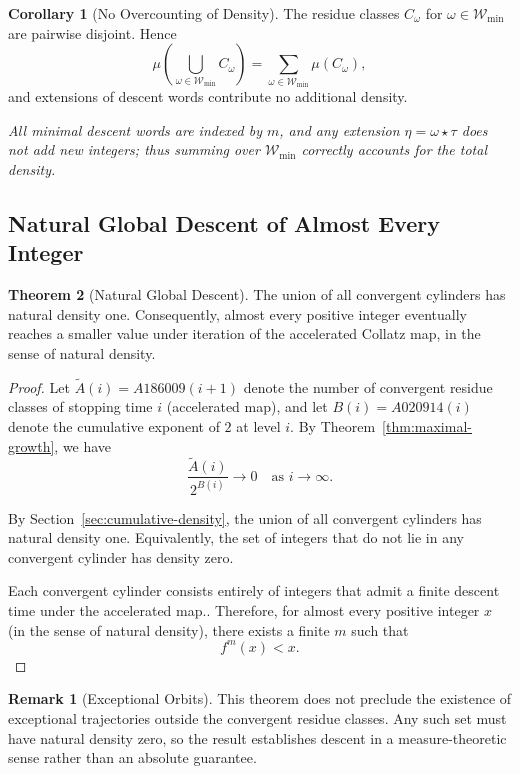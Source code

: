 \documentclass[12pt, oneside]{article}   	%
\numberwithin{equation}{section}          %
\theoremstyle{definition}
\newtheorem{theorem}{Theorem}
\newtheorem{corollary}[theorem]{Corollary}
\newtheorem*{remark}{Remark}
\begin{document}
\begin{corollary}[No Overcounting of Density]
\label{cor:no-overcount}
The residue classes $C_\omega$ for $\omega \in \mathcal{W}_{\min}$ are pairwise
disjoint. Hence
\[
\mu\!\left(\bigcup_{\omega\in\mathcal{W}_{\min}} C_\omega\right)
= \sum_{\omega\in\mathcal{W}_{\min}} \mu(C_\omega),
\]
and extensions of descent words contribute no additional density.

\emph{All minimal descent words are indexed by $m$, and any extension
$\eta = \omega \star \tau$ does not add new integers; thus summing over
$\mathcal{W}_{\min}$ correctly accounts for the total density.}
\end{corollary}


\subsection{Natural Global Descent of Almost Every Integer}

\begin{theorem}[Natural Global Descent]
\label{thm:natural-descent}
The union of all convergent cylinders has natural density one. Consequently,
almost every positive integer eventually reaches a smaller value under iteration
of the accelerated Collatz map, in the sense of natural density.
\end{theorem}

\begin{proof}
Let $\widetilde A(i) = A186009(i+1)$ denote the number of convergent residue classes
of stopping time $i$ (accelerated map), and let $B(i) = A020914(i)$ denote the cumulative exponent
of $2$ at level $i$. By Theorem~\ref{thm:maximal-growth}, we have
\[
\frac{\widetilde A(i)}{2^{B(i)}} \longrightarrow 0 \quad \text{as } i \to \infty.
\]

By Section~\ref{sec:cumulative-density}, the union of all convergent
cylinders has natural density one. Equivalently, the set of integers
that do not lie in any convergent cylinder has density zero.

Each convergent cylinder consists entirely of integers that admit a finite
descent time under the accelerated map.. Therefore, for almost every
positive integer $x$ (in the sense of natural density), there exists a
finite $m$ such that
\[
f^m(x) < x.
\]
\end{proof}

\begin{remark}[Exceptional Orbits]
This theorem does not preclude the existence of exceptional trajectories outside
the convergent residue classes. Any such set must have natural density zero, 
so the result establishes descent in a measure-theoretic sense rather than an absolute guarantee.
\end{remark}
\end{document}
